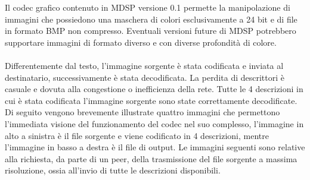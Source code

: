 Il codec grafico contenuto in MDSP versione 0.1 permette la manipolazione di
immagini che possiedono una maschera di colori esclusivamente a 24 bit e di
file in formato BMP non compresso. Eventuali versioni future di MDSP potrebbero
supportare immagini di formato diverso e con diverse profondità di colore.
\\\\
Differentemente dal testo, l'immagine sorgente è stata codificata e
inviata al destinatario, successivamente è stata decodificata. La perdita di descrittori è casuale e dovuta alla congestione o inefficienza della rete. Tutte le 4 descrizioni in cui è stata codificata
l'immagine sorgente sono state correttamente decodificate. Di seguito vengono
brevemente illustrate quattro immagini che permettono l'immediata visione del funzionamento del codec nel suo complesso, l'immagine in alto a sinistra è il file sorgente e viene
codificato in 4 descrizioni, mentre l'immagine in basso a destra è il file di
output. Le immagini seguenti sono relative alla richiesta, da parte di un peer,
della trasmissione del file sorgente a massima risoluzione, ossia all'invio di
tutte le descrizioni disponibili.

